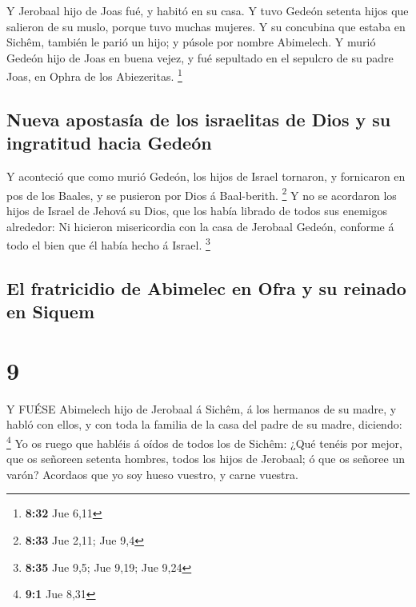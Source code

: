  Y Jerobaal hijo de Joas fué, y habitó en su casa.
 Y tuvo Gedeón setenta hijos que salieron de su muslo,
porque tuvo muchas mujeres.  Y su concubina que estaba en
Sichêm, también le parió un hijo; y púsole por nombre Abimelech.
 Y murió Gedeón hijo de Joas en buena vejez, y fué
sepultado en el sepulcro de su padre Joas, en Ophra de los Abiezeritas.
\footnote{\textbf{8:32} Jue 6,11}

\hypertarget{nueva-apostasuxeda-de-los-israelitas-de-dios-y-su-ingratitud-hacia-gedeuxf3n}{%
\subsection{Nueva apostasía de los israelitas de Dios y su ingratitud
hacia
Gedeón}\label{nueva-apostasuxeda-de-los-israelitas-de-dios-y-su-ingratitud-hacia-gedeuxf3n}}

 Y aconteció que como murió Gedeón, los hijos de Israel
tornaron, y fornicaron en pos de los Baales, y se pusieron por Dios á
Baal-berith. \footnote{\textbf{8:33} Jue 2,11; Jue 9,4}  Y
no se acordaron los hijos de Israel de Jehová su Dios, que los había
librado de todos sus enemigos alrededor:  Ni hicieron
misericordia con la casa de Jerobaal Gedeón, conforme á todo el bien que
él había hecho á Israel. \footnote{\textbf{8:35} Jue 9,5; Jue 9,19; Jue
  9,24}

\hypertarget{el-fratricidio-de-abimelec-en-ofra-y-su-reinado-en-siquem}{%
\subsection{El fratricidio de Abimelec en Ofra y su reinado en
Siquem}\label{el-fratricidio-de-abimelec-en-ofra-y-su-reinado-en-siquem}}

\hypertarget{section-8}{%
\section{9}\label{section-8}}

 Y FUÉSE Abimelech hijo de Jerobaal á Sichêm, á los hermanos
de su madre, y habló con ellos, y con toda la familia de la casa del
padre de su madre, diciendo: \footnote{\textbf{9:1} Jue 8,31}
 Yo os ruego que habléis á oídos de todos los de Sichêm:
¿Qué tenéis por mejor, que os señoreen setenta hombres, todos los hijos
de Jerobaal; ó que os señoree un varón? Acordaos que yo soy hueso
vuestro, y carne vuestra.

